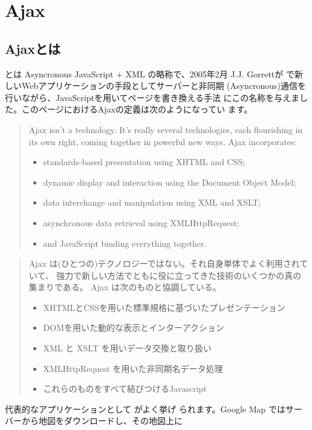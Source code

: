 \section{Ajax}
\subsection{Ajaxとは}
 とは Asyncronous JavaScript + XML の略称で、2005年2月
{J.J. Gorrett}が
で新しいWebアプリケーションの手段としてサーバーと非同期
(Asyncronous)通信を行いながら、JavaScriptを用いてページを書き換える手法
にこの名称を与えました。このページにおけるAjaxの定義は次のようになってい
ます。
\begin{quote}
 Ajax isn't a technology. It's really several technologies, each
 flourishing in its own right, coming together in powerful new
 ways. Ajax incorporates: 
\begin{itemize}
 \item standards-based presentation using XHTML and CSS;
 \item dynamic display and interaction using the Document Object Model;
 \item data interchange and manipulation using XML and XSLT;
 \item asynchronous data retrieval using XMLHttpRequest;
 \item and JavaScript binding everything together.
\end{itemize}
\end{quote}
\begin{quote}
 Ajax は(ひとつの)テクノロジーではない。それ自身単体でよく利用されていて、
強力で新しい方法でともに役に立ってきた技術のいくつかの真の集まりである。
 Ajax は次のものと協調している。
\begin{itemize}
 \item XHTMLとCSSを用いた標準規格に基づいたプレゼンテーション
 \item DOMを用いた動的な表示とインターアクション
 \item XML と XSLT を用いデータ交換と取り扱い
 \item XMLHttpRequest を用いた非同期名データ処理
 \item これらのものをすべて結びつけるJavascript
\end{itemize}
\end{quote}
代表的なアプリケーションとして  がよく挙げ
られます。Google Map ではサーバーから地図をダウンロードし、その地図上に
